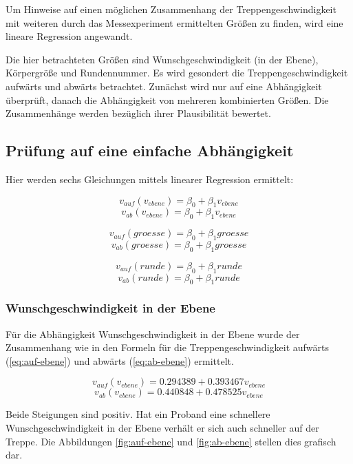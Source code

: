 Um Hinweise auf einen möglichen Zusammenhang der Treppengeschwindigkeit mit weiteren durch das Messexperiment ermittelten Größen zu finden, wird eine lineare 
Regression angewandt.

Die hier betrachteten Größen sind Wunschgeschwindigkeit (in der Ebene),
Körpergröße und Rundennummer. Es wird gesondert die Treppengeschwindigkeit aufwärts und abwärts betrachtet.
Zunächst wird nur auf eine Abhängigkeit überprüft, danach die Abhängigkeit von mehreren kombinierten Größen. Die Zusammenhänge werden bezüglich ihrer Plausibilität bewertet.

\subsection{Prüfung auf eine einfache Abhängigkeit}

Hier werden sechs Gleichungen mittels linearer Regression ermittelt: 

\[v_{auf}(v_{ebene}) = \beta_0 + \beta_1 v_{ebene}\]
\[v_{ab}(v_{ebene}) = \beta_0 + \beta_1 v_{ebene}\]

\[v_{auf}(groesse) = \beta_0 + \beta_1 groesse\]
\[v_{ab}(groesse) = \beta_0 + \beta_1 groesse\]

\[v_{auf}(runde) = \beta_0 + \beta_1 runde\]
\[v_{ab}(runde) = \beta_0 + \beta_1 runde\]

\subsubsection{Wunschgeschwindigkeit in der Ebene}

Für die Abhängigkeit Wunschgeschwindigkeit in der Ebene wurde 
der Zusammenhang wie in den Formeln für die Treppengeschwindigkeit aufwärts (\ref{eq:auf-ebene}) und abwärts (\ref{eq:ab-ebene}) ermittelt. 

\begin{equation} \label{eq:auf-ebene}
	v_{auf}(v_{ebene}) = 0.294389 + 0.393467 v_{ebene}
\end{equation}
\begin{equation} \label{eq:ab-ebene}
	v_{ab}(v_{ebene}) = 0.440848 + 0.478525 v_{ebene}
\end{equation}

Beide Steigungen sind positiv. Hat ein Proband eine schnellere Wunschgeschwindigkeit in der Ebene verhält er sich auch schneller auf 
der Treppe. Die Abbildungen \ref{fig:auf-ebene} und \ref{fig:ab-ebene}
stellen dies grafisch dar. 

